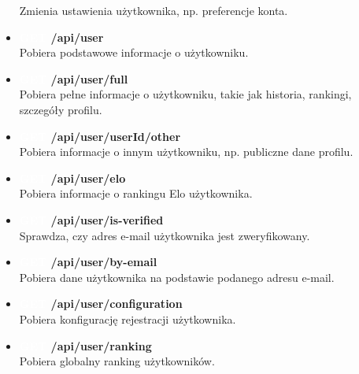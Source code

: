 \documentclass[12pt,a4paper]{article}
\begin{document}
\begin{itemize}
    Zmienia ustawienia użytkownika, np. preferencje konta. 
    \item \textbf{\colorbox{cyan!90}{\textcolor{white}{GET}} /api/user} \\
    Pobiera podstawowe informacje o użytkowniku. 
    \item \textbf{\colorbox{cyan!90}{\textcolor{white}{GET}} /api/user/full} \\
    Pobiera pełne informacje o użytkowniku, takie jak historia, rankingi, szczegóły profilu. 
    \item \textbf{\colorbox{cyan!90}{\textcolor{white}{GET}} /api/user/{userId}/other} \\
    Pobiera informacje o innym użytkowniku, np. publiczne dane profilu. 
    \item \textbf{\colorbox{cyan!90}{\textcolor{white}{GET}} /api/user/elo} \\
    Pobiera informacje o rankingu Elo użytkownika. 
    \item \textbf{\colorbox{cyan!90}{\textcolor{white}{GET}} /api/user/is-verified} \\
    Sprawdza, czy adres e-mail użytkownika jest zweryfikowany. 
    \item \textbf{\colorbox{cyan!90}{\textcolor{white}{GET}} /api/user/by-email} \\
    Pobiera dane użytkownika na podstawie podanego adresu e-mail. 
    \item \textbf{\colorbox{cyan!90}{\textcolor{white}{GET}} /api/user/configuration} \\
    Pobiera konfigurację rejestracji użytkownika. 
    \item \textbf{\colorbox{cyan!90}{\textcolor{white}{GET}} /api/user/ranking} \\
    Pobiera globalny ranking użytkowników. 
\end{itemize}

\newpage
\end{document}
